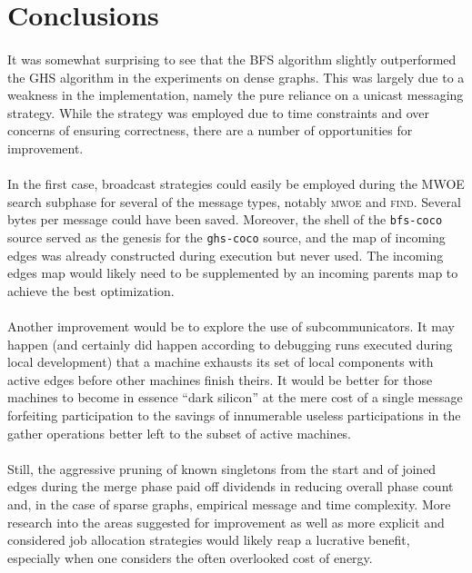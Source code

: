 \documentclass[11pt,epsf]{article}
\begin{document}
\section{Conclusions}{
  \paragraph{}{
    It was somewhat surprising to see that the BFS algorithm slightly outperformed
    the GHS algorithm in the experiments on dense graphs. This was largely due to a
    weakness in the implementation, namely the pure reliance on a unicast messaging
    strategy. While the strategy was employed due to time constraints and over concerns
    of ensuring correctness, there are a number of opportunities for improvement.
  }
  \paragraph{}{
    In the first case, broadcast strategies could easily be employed during the MWOE
    search subphase for several of the message types, notably \textsc{mwoe} and
    \textsc{find}. Several bytes per message could have been saved. Moreover, the
    shell of the \texttt{bfs-coco} source served as the genesis for the \texttt{ghs-coco}
    source, and the map of incoming edges was already constructed during execution
    but never used. The incoming edges map would likely need to be supplemented by
    an incoming parents map to achieve the best optimization.
  }
  \paragraph{}{
    Another improvement would be to explore the use of subcommunicators. It may happen
    (and certainly did happen according to debugging runs executed during local
    development) that a machine exhausts its set of local components with active edges
    before other machines finish theirs. It would be better for those machines to
    become in essence ``dark silicon'' at the mere cost of a single message forfeiting
    participation to the savings of innumerable useless participations in the gather
    operations better left to the subset of active machines.
  }
  \paragraph{}{
    Still, the aggressive pruning of known singletons from the start and of joined edges
    during the merge phase paid off dividends in reducing overall phase count and,
    in the case of sparse graphs, empirical message and time complexity. More research
    into the areas suggested for improvement as well as more explicit and considered
    job allocation strategies would likely reap a lucrative benefit, especially
    when one considers the often overlooked cost of energy.
  }
}
\end{document}
